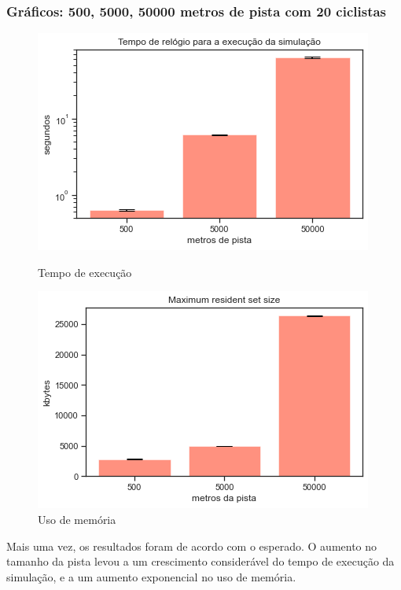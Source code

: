 \documentclass{beamer}
\begin{document}
\begin{frame}
\frametitle{Gráficos: 500, 5000, 50000 metros de pista com 20 ciclistas}


\begin{figure}[!htb]
  \includegraphics[width=\linewidth]{imgs/pistas_tempo}
  \caption{Tempo de execução}\label{fig:awesome_image1}
\endminipage\hfill
{}
  \includegraphics[width=\linewidth]{imgs/pistas_memoria}
  \caption{Uso de memória}\label{fig:awesome_image2}
  \endminipage\hfill

\end{figure}

Mais uma vez, os resultados foram de acordo com o esperado. O aumento no tamanho da pista levou a um crescimento
    considerável do tempo de execução da simulação, e a um aumento exponencial no uso de memória.

\end{frame}
\end{document}

